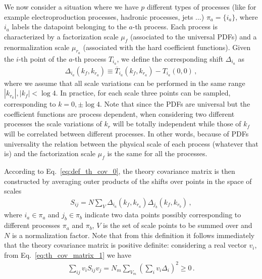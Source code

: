 %
We now consider a situation where we have $p$ different types of processes (like for example electroproduction processes, 
hadronic processes, jets ...) $\pi_a = \{i_a\}$, where $i_a$ labels the datapoint belonging to the $a$-th process.
Each process is characterized by a factorization scale $\mu_f$ (associated to the universal PDFs) and a renormalization scale 
$\mu_{r_a}$ (associated with the hard coefficient functions).
Given the $i$-th point of the $a$-th process $T_{i_a}$, we define the corresponding shift $\Delta_{i_a}$ as 
\begin{align}
    \Delta_{i_a}\left(k_f,k_{r_a}\right) \equiv \overline{T}_{i_a}\left(k_f, k_{r_a}\right) - T_{i_a}\left(0, 0\right)\,,
\end{align}
where we assume that all scale variations can be performed in the same range $|k_{r_a}|, |k_f| < \log 4$.
In practice, for each scale three points can be sampled, corresponding to $k = 0, \pm \log 4$.
Note that since the PDFs are universal but the coefficient functions are process dependent,
when considering two different processes the scale variations of $k_{r}$ will be totally independent 
while those of $k_f$ will be correlated between different processes. 
In other words, because of PDFs universality the relation between the physical scale of each process (whatever that is)
and the factorization scale $\mu_f$ is the same for all the processes.

According to Eq.~\ref{eq:def_th_cov_0}, the theory covariance matrix is then constructed by averaging
outer products of the shifts over points in the space of scales 
\begin{align}
    \label{eq:th_cov_matrix_1}
    S_{ij} = N \sum_V \Delta_{i_a}\left(k_f,k_{r_a}\right) \Delta_{j_b}\left(k_f,k_{r_b}\right)\,,
\end{align} 
where $i_a \in \pi_a$ and $j_b \in \pi_b$ indicate two data points possibly corresponding to different
processes $\pi_a$ and $\pi_b$, $V$ is the set of scale points to be summed over and $N$ is a normalization factor.
Note that from this definition it follows immediately that the
theory covariance matrix is positive definite: considering a real vector $v_i$, from Eq.~\ref{eq:th_cov_matrix_1}
we have
\begin{align}
    \sum_{ij} v_i S_{ij} v_j = N_m \sum_{V_m}\left(\sum_i v_i \Delta_i\right)^2 \geq 0\,.
\end{align}



